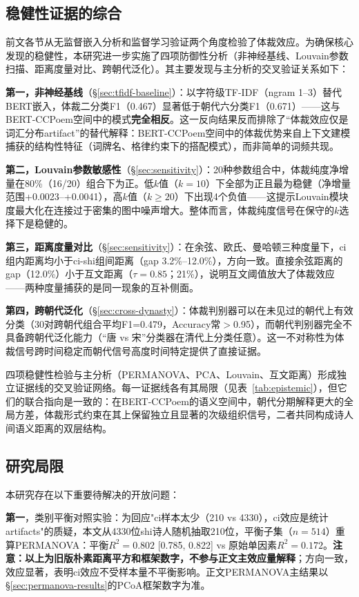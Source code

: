 \documentclass[12pt,a4paper]{article}
\numberwithin{equation}{section}
\begin{document}
\subsection{稳健性证据的综合}

前文各节从无监督嵌入分析和监督学习验证两个角度检验了体裁效应。为确保核心发现的稳健性，本研究进一步实施了四项防御性分析（非神经基线、Louvain参数扫描、距离度量对比、跨朝代泛化）。其主要发现与主分析的交叉验证关系如下：

\textbf{第一，非神经基线}（§\ref{sec:tfidf-baseline}）：以字符级TF-IDF（ngram 1--3）替代BERT嵌入，体裁二分类F1（0.467）显著低于朝代六分类F1（0.671）——这与BERT-CCPoem空间中的模式\textbf{完全相反}。这一反向结果反而排除了“体裁效应仅是词汇分布artifact”的替代解释：BERT-CCPoem空间中的体裁优势来自上下文建模捕获的结构性特征（词牌名、格律约束下的搭配模式），而非简单的词频共现。

\textbf{第二，Louvain参数敏感性}（§\ref{sec:sensitivity}）：20种参数组合中，体裁纯度净增量在80\%（16/20）组合下为正。低$k$值（$k=10$）下全部为正且最为稳健（净增量范围+0.0023--+0.0041），高$k$值（$k\ge20$）下出现4个负值——这提示Louvain模块度最大化在连接过于密集的图中噪声增大。整体而言，体裁纯度信号在保守的$k$选择下是稳健的。

\textbf{第三，距离度量对比}（§\ref{sec:sensitivity}）：在余弦、欧氏、曼哈顿三种度量下，ci组内距离均小于ci-shi组间距离（gap 3.2\%--12.0\%），方向一致。直接余弦距离的gap（12.0\%）小于互文距离（$\tau=0.85$；21\%），说明互文阈值放大了体裁效应——两种度量捕获的是同一现象的互补侧面。

\textbf{第四，跨朝代泛化}（§\ref{sec:cross-dynasty}）：体裁判别器可以在未见过的朝代上有效分类（30对跨朝代组合平均F1=0.479，Accuracy常$>$0.95），而朝代判别器完全不具备跨朝代泛化能力（“唐 vs 宋”分类器在清代上分类任意）。这一不对称性为体裁信号跨时间稳定而朝代信号高度时间特定提供了直接证据。

四项稳健性检验与主分析（PERMANOVA、PCA、Louvain、互文距离）形成独立证据线的交叉验证网络。每一证据线各有其局限（见表~\ref{tab:epistemic}），但它们的联合指向是一致的：在BERT-CCPoem的语义空间中，朝代分期解释更大的全局方差，体裁形式约束在其上保留独立且显著的次级组织信号，二者共同构成诗人间语义距离的双层结构。

\subsection{研究局限}
\label{sec:limitations}

本研究存在以下重要待解决的开放问题：

\textbf{第一}，类别平衡对照实验：为回应"ci样本太少（210 vs 4330），ci效应是统计artifacts"的质疑，本文从4330位shi诗人随机抽取210位，平衡子集（$n=514$）重算PERMANOVA：平衡$R^{2}=0.802$ [0.785, 0.822] vs 原始单因素$R^{2}=0.172$。\textbf{注意：以上为旧版朴素距离平方和框架数字，不参与正文主效应量解释}；方向一致，效应显著，表明ci效应不受样本量不平衡影响。正文PERMANOVA主结果以§\ref{sec:permanova-results}的PCoA框架数字为准。
\end{document}
